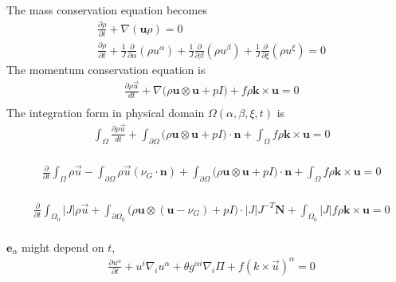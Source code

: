 \documentclass{report}
\numberwithin{equation}{section}
\begin{document}
The mass conservation equation becomes
\begin{align*}
    &\frac{\partial \rho}{\partial t} + \nabla (\bm{u}\rho) = 0 \\
    &\frac{\partial \rho}{\partial t}  + \frac{1}{J} \frac{\partial }{\partial \alpha} (\rho u^{\alpha}) + \frac{1}{J} \frac{\partial }{\partial \beta} (\rho u^{\beta}) + \frac{1}{J} \frac{\partial }{\partial \xi} (\rho u^{\xi}) = 0
\end{align*}
The momentum conservation equation is
\begin{align*}
    &\frac{\partial \rho \vec{u}}{dt} + \nabla \Big(\rho \bm{u} \otimes \bm{u} + pI\Big) + f\rho \bm{k}\times \bm{u} = 0 \\
\end{align*}
The integration form in physical domain $\Omega(\alpha, \beta, \xi, t)$ is 
\begin{align*}
    &\int_{\Omega} \frac{\partial \rho \vec{u}}{dt} + \int_{\partial \Omega} \Big(\rho \bm{u} \otimes \bm{u} + pI\Big) \cdot \bm{n} + \int_{\Omega} f\rho\bm{k}\times \bm{u} = 0 \\
\end{align*}

\begin{align*}
    &\frac{\partial}{\partial t} \int_{\Omega} \rho \vec{u} - \int_{\partial \Omega} \rho \vec{u} (\nu_G \cdot \bm{n}) + \int_{\partial \Omega} \Big(\rho \bm{u} \otimes \bm{u} + pI\Big) \cdot \bm{n} + \int_{\Omega} f\rho\bm{k}\times \bm{u} = 0 \\
\end{align*}


\begin{align*}
    &\frac{\partial}{\partial t} \int_{\Omega_0} |J|\rho \vec{u} + \int_{\partial \Omega_0} \Big(\rho \bm{u} \otimes (\bm{u} - \nu_G) + pI\Big) \cdot |J|J^{-T}\bm{N} + \int_{\Omega_0} |J|f\rho\bm{k}\times \bm{u} = 0 \\
\end{align*}

 $\bm{e}_{\alpha}$ might depend on $t$, 
\begin{align*}
    &\frac{\partial u^{\alpha}}{\partial t} + u^{i} \nabla_i u^{\alpha} + \theta g^{\alpha i} \nabla_i \Pi + f(k\times \vec{u})^{\alpha} = 0 \\
\end{align*}
\end{document}
